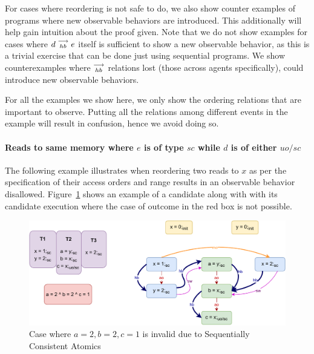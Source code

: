 
    For cases where reordering is not safe to do, we also show counter examples of programs where new observable behaviors are introduced.
    This additionally will help gain intuition about the proof given. 
    Note that we do not show examples for cases where $d\stackrel{\longrightarrow}{_{hb}}e$ itself is sufficient to show a new observable behavior, as this is a trivial exercise that can be done just using sequential programs.
    We show counterexamples where $\stackrel{\longrightarrow}{_{hb}}$ relations lost (those across agents specifically), could introduce new observable behaviors. 

    For all the examples we show here, we only show the ordering relations that are important to observe. 
    Putting all the relations among different events in the example will result in confusion, hence we avoid doing so. 

    \paragraph{Reads to same memory where $e$ is of type $sc$ while $d$ is of either $uo/sc$}

        The following example illustrates when reordering two reads to $x$ as per the specification of their access orders and range results in an observable behavior disallowed.
        Figure~\ref{reord_counter:example1(a)} shows an example of a candidate along with with its candidate execution where the case of outcome in the red box is not possible. 
        \begin{figure}[H]
            \centering
            \includegraphics[scale=0.7]{5.InstructionReordering/4.ValidReorderingCandidate/Example0(Rsc-Ruo,sc).pdf}
            \caption{Case where $a = 2, b = 2, c = 1$ is invalid due to Sequentially Consistent Atomics}
            \label{reord_counter:example1(a)}
        \end{figure}
        
